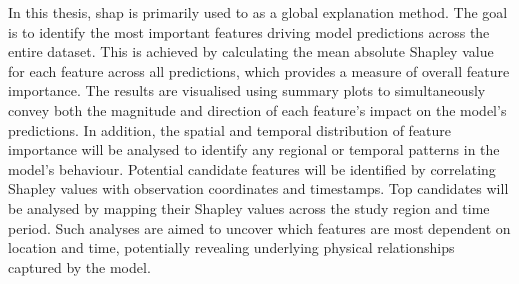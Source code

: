 In this thesis, \acrshort{shap} is primarily used to as a global explanation method. The goal is to identify the most important features driving model predictions across the entire dataset. This is achieved by calculating the mean absolute Shapley value for each feature across all predictions, which provides a measure of overall feature importance. The results are visualised using summary plots to simultaneously convey both the magnitude and direction of each feature's impact on the model's predictions. In addition, the spatial and temporal distribution of feature importance will be analysed to identify any regional or temporal patterns in the model's behaviour. Potential candidate features will be identified by correlating Shapley values with observation coordinates and timestamps. Top candidates will be analysed by mapping their Shapley values across the study region and time period. Such analyses are aimed to uncover which features are most dependent on location and time, potentially revealing underlying physical relationships captured by the model.
